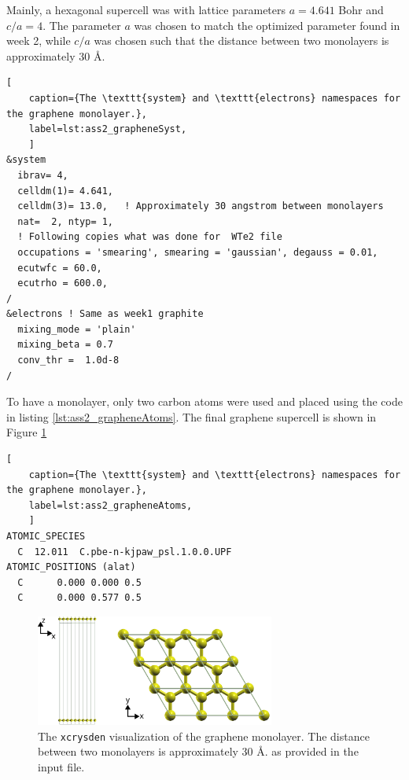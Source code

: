 \documentclass[10pt,a4paper]{labreport}
\begin{document}
Mainly, a hexagonal supercell was with lattice parameters $a=4.641$ Bohr and $c/a=4$. The parameter $a$ was chosen to match the optimized parameter found in week 2, while $c/a$ was chosen such that the distance between two monolayers is approximately 30 \AA.   
\begin{lstlisting}[ 
    caption={The \texttt{system} and \texttt{electrons} namespaces for the graphene monolayer.},
    label=lst:ass2_grapheneSyst,
    ]
&system    
  ibrav= 4,
  celldm(1)= 4.641, 
  celldm(3)= 13.0,   ! Approximately 30 angstrom between monolayers
  nat=  2, ntyp= 1, 
  ! Following copies what was done for  WTe2 file
  occupations = 'smearing', smearing = 'gaussian', degauss = 0.01,
  ecutwfc = 60.0,
  ecutrho = 600.0,
/
&electrons ! Same as week1 graphite
  mixing_mode = 'plain'
  mixing_beta = 0.7 
  conv_thr =  1.0d-8
/
\end{lstlisting}

To have a monolayer, only two carbon atoms were used and placed using the code in listing \ref{lst:ass2_grapheneAtoms}. The final graphene supercell is shown in Figure \ref{fig:ass2_graphene_cryst}
\begin{lstlisting}[ 
    caption={The \texttt{system} and \texttt{electrons} namespaces for the graphene monolayer.},
    label=lst:ass2_grapheneAtoms,
    ]
ATOMIC_SPECIES
  C  12.011  C.pbe-n-kjpaw_psl.1.0.0.UPF
ATOMIC_POSITIONS (alat)
  C      0.000 0.000 0.5
  C      0.000 0.577 0.5
\end{lstlisting}

\begin{figure}[h]
    \centering 
    \includegraphics[width = 0.7\textwidth]{figs/ass2_graphene_struct.png}
    \caption{The \texttt{xcrysden} visualization of the graphene monolayer. The distance between two monolayers is approximately 30 \AA. as provided in the input file. }
    \label{fig:ass2_graphene_cryst}
  \end{figure}

\newpage
\end{document}
